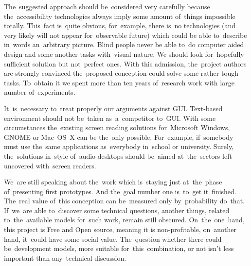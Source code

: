 \documentclass{acm_proc_article-sp}
\begin{document}
The~suggested approach should be~considered very carefully because  the~accessibility technologies 
always imply some amount of~things impossible totally.
This~fact is~quite obvious, 
for~example, there is~no technologies (and very likely will not appear  for~observable future)
which could be able to~describe in~words an~arbitrary picture.
Blind people never be able to~do computer aided design and some another tasks with~visual nature.
We should look for~hopefully sufficient solution but not~perfect ones.
With this admission, the~project authors are strongly convinced the~proposed conception could solve some rather tough tasks.
To~obtain it we spent more than ten years of~research work with large number of~experiments.

It~is~necessary to~treat properly our arguments against GUI.
Text-based environment should not be~taken as~a~competitor to~GUI.
With some circumstances the~existing  screen reading solutions for~Microsoft Windows, GNOME or Mac~OS~X
can be the~only possible.
For~example, if~somebody must use the~same applications as~everybody in~school or university.
Surely, the~solutions in~style of~audio desktops 
should be~aimed at~the~sectors left uncovered with~screen readers.

We~are still speaking about the~work which is~staying just at~the~phase of~presenting first prototypes.
And the~goal number one is~to~get it~finished.
The~real value of~this conception can be~measured only by~probability do~that.
If~we~are able to~discover some technical questions, 
another things, related to~the~available models for~such work, remain still obscured.
On~the~one~hand, this project is Free and Open source, meaning it is non-profitable,
on~another hand, it~could have some social value. 
The~question whether there could be~development models,  more suitable for~this~combination,  or not 
isn't less important than any~technical discussion.

\end{document}
